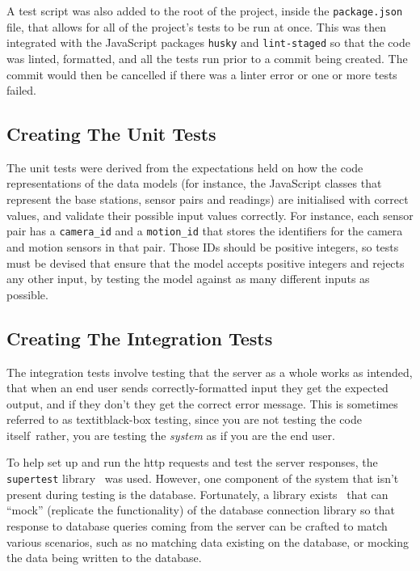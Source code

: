 A test script was also added to the root of the project, inside the
\texttt{package.json} file, that allows for all of the project's tests to be
run at once. This was then integrated with the JavaScript packages
\texttt{husky} and \texttt{lint-staged} so that the code was linted,
formatted, and all the tests run prior to a commit being created. The commit
would then be cancelled if there was a linter error or one or more tests failed.

\subsection{Creating The Unit Tests}
The unit tests were derived from the expectations held on how the code
representations of the data models (for instance, the JavaScript classes that
represent the base stations, sensor pairs and readings) are initialised with
correct values, and validate their possible input values correctly. For
instance, each sensor pair has a \texttt{camera\_id} and a
\texttt{motion\_id} that stores the identifiers for the camera and motion
sensors in that pair. Those IDs should be positive integers, so tests must be
devised that ensure that the model accepts positive integers and rejects any
other input, by testing the model against as many different inputs as
possible.

\subsection{Creating The Integration Tests}

The integration tests involve testing that the server as a whole works as
intended, that when an end user sends correctly-formatted input they get the
expected output, and if they don't they get the correct error message. This
is sometimes referred to as textit{black-box testing}, since you are not
testing the code itself\textemdash~rather, you are testing the
\textit{system} as if you are the end user.

To help set up and run the \acrshort{http} requests and test the server
responses, the \texttt{supertest} library~\cite{supertest} was used. However,
one component of the system that isn't present during testing is the
database. Fortunately, a library exists~\cite{mock-knex} that can ``mock''
(replicate the functionality) of the database connection library so that
response to database queries coming from the server can be crafted to match
various scenarios, such as no matching data existing on the database, or
mocking the data being written to the database.

